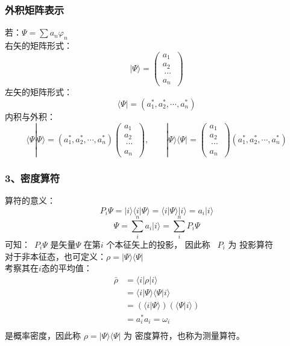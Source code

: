 \begin{frame}
    \frametitle{外积矩阵表示}
    若：$ \Psi =\sum a_n \varphi_n $\\
    右矢的矩阵形式：
    $$|\Psi\rangle = \begin{pmatrix}
        a_1\\
        a_2\\\
        \cdots\\
        a_n\
    \end{pmatrix}$$ 
    左矢的矩阵形式：
    $$ \langle\Psi| = (a_1 ^*, a_2 ^*, \cdots, a_n ^*) $$
    内积与外积：
    $$\langle\Psi|\Psi\rangle= (a_1 ^*, a_2 ^*, \cdots, a_n ^*) \begin{pmatrix}
        a_1\\
        a_2\\\
        \cdots\\
        a_n\
    \end{pmatrix},\qquad  |\Psi\rangle\langle\Psi|= \begin{pmatrix}
        a_1\\
        a_2\\\
        \cdots\\
        a_n\
    \end{pmatrix} (a_1 ^*, a_2 ^*, \cdots, a_n ^*) $$
\end{frame} 


\begin{frame}
    \frametitle{3、密度算符}
    算符的意义：
    $$P_i\Psi= |i\rangle\langle i | \Psi \rangle = \langle i | \Psi \rangle |i\rangle=a_i |i\rangle $$
    $$\Psi= \sum\limits_i ^n a_i |i\rangle = \sum\limits_i ^n P_i\Psi$$
    可知： $ P_i\Psi $ 是矢量$\Psi$ 在第$i$ 个本征矢上的投影， 因此称  $P_i $ 为{\color{red} 投影算符}\\
    对于非本征态，也可定义：$\rho = |\Psi\rangle\langle \Psi |$\\
    考察其在$i$态的平均值：
    $$ \begin{aligned}
    \bar{\rho} &=\langle i |\rho | i \rangle \\
               &=\langle i |\Psi\rangle\langle \Psi | i \rangle \\
               &=(\langle i |\Psi\rangle) (\langle \Psi | i \rangle) \\
               &=a_i ^* a_i =\omega_i \\
    \end{aligned} $$
    是概率密度，因此称 $\rho = |\Psi\rangle\langle \Psi |$ 为 {\color{red} 密度算符}，也称为测量算符。
\end{frame} 
 
